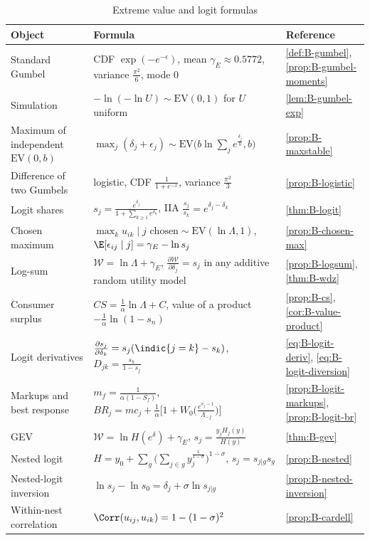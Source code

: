 \begin{table}[!tb]
\centering
\caption{Extreme value and logit formulas}\label{tab:B-ev}
\footnotesize
\renewcommand{\arraystretch}{1.35}
\begin{tabularx}{\textwidth}{@{}>{\raggedright\arraybackslash}p{3.7cm}>{\raggedright\arraybackslash}X>{\raggedright\arraybackslash}p{2.6cm}@{}}
\toprule
Object & Formula & Reference \\
\midrule
Standard Gumbel & CDF $\exp(-e^{-\epsilon})$, mean $\gamma_E \approx 0.5772$, variance $\frac{\pi^2}{6}$, mode $0$ &
  \cref{def:B-gumbel}, \cref{prop:B-gumbel-moments} \\
Simulation & $-\ln(-\ln U) \sim \mathrm{EV}(0, 1)$ for $U$ uniform & \cref{lem:B-gumbel-exp} \\
Maximum of independent $\mathrm{EV}(0, b)$ & $\max_j(\delta_j + \epsilon_j) \sim \mathrm{EV}\big(b\ln\sum_je^{\frac{\delta_j}{b}}, b\big)$ &
  \cref{prop:B-maxstable} \\
Difference of two Gumbels & logistic, CDF $\frac{1}{1 + e^{-x}}$, variance $\frac{\pi^2}{3}$ & \cref{prop:B-logistic} \\
Logit shares & $s_j = \frac{e^{\delta_j}}{1 + \sum_{k \geq 1}e^{\delta_k}}$, IIA $\frac{s_j}{s_k} = e^{\delta_j - \delta_k}$ &
  \cref{thm:B-logit} \\
Chosen maximum & $\max_ku_{ik} \mid j \text{ chosen} \sim \mathrm{EV}(\ln\Lambda, 1)$,
  $\E[\epsilon_{ij} \mid j] = \gamma_E - \ln s_j$ & \cref{prop:B-chosen-max} \\
Log-sum & $\mathcal{W} = \ln\Lambda + \gamma_E$, $\frac{\partial\mathcal{W}}{\partial\delta_j} = s_j$ in any additive random utility model &
  \cref{prop:B-logsum}, \cref{thm:B-wdz} \\
Consumer surplus & $CS = \frac{1}{\alpha}\ln\Lambda + C$, value of a product $-\frac{1}{\alpha}\ln(1 - s_n)$ &
  \cref{prop:B-cs}, \cref{cor:B-value-product} \\
Logit derivatives & $\frac{\partial s_j}{\partial\delta_k} = s_j(\indic\{j = k\} - s_k)$, $D_{jk} = \frac{s_k}{1 - s_j}$ &
  \eqref{eq:B-logit-deriv}, \eqref{eq:B-logit-diversion} \\
Markups and best response & $m_f = \frac{1}{\alpha(1 - S_f)}$, $BR_j = mc_j + \frac{1}{\alpha}\big[1 + W_0\big(\frac{e^{v_j - 1}}{\Lambda_{-j}}\big)\big]$ &
  \cref{prop:B-logit-markups}, \cref{prop:B-logit-br} \\
GEV & $\mathcal{W} = \ln H(e^\delta) + \gamma_E$, $s_j = \frac{y_jH_j(y)}{H(y)}$ & \cref{thm:B-gev} \\
Nested logit & $H = y_0 + \sum_g\big(\sum_{j \in g}y_j^{\frac{1}{1 - \sigma}}\big)^{1 - \sigma}$, $s_j = s_{j|g}s_g$ &
  \cref{prop:B-nested} \\
Nested-logit inversion & $\ln s_j - \ln s_0 = \delta_j + \sigma\ln s_{j|g}$ & \cref{prop:B-nested-inversion} \\
Within-nest correlation & $\Corr(u_{ij}, u_{ik}) = 1 - (1 - \sigma)^2$ & \cref{prop:B-cardell} \\
\bottomrule
\end{tabularx}


\end{table}
